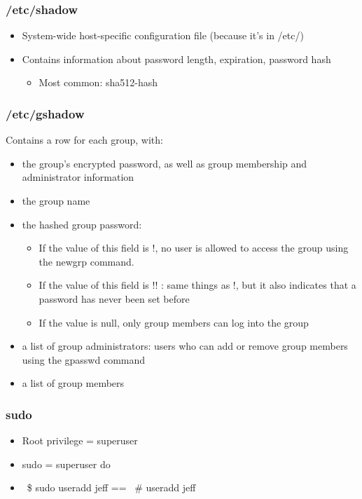 \documentclass{article}
\begin{document}
\subsubsection{/etc/shadow}

\begin{itemize}
    \item System-wide host-specific configuration file (because it's in /etc/)
    \item Contains information about password length, expiration, password hash
    \begin{itemize}
        \item Most common: sha512-hash
    \end{itemize}
\end{itemize}

\subsubsection{/etc/gshadow}

Contains a row for each group, with:

\begin{itemize}
    \item the group's encrypted password, as well as group membership and administrator information
    \item the group name
    \item the hashed group password: 
    \begin{itemize}
        \item If the value of this field is !, no user is allowed to access the group using the newgrp command. 
        \item If the value of this field is !! : same things as !, but it also indicates that a password has never been set before
        \item If the value is null, only group members can log into the group
    \end{itemize}
    \item a list of group administrators: users who can add or remove group members using the gpasswd command
    \item a list of group members
\end{itemize}

\subsubsection{sudo}

\begin{itemize}
    \item Root privilege = superuser
    \item sudo = superuser do
    \item ~\$ sudo useradd jeff == ~\# useradd jeff
\end{itemize}
\end{document}
